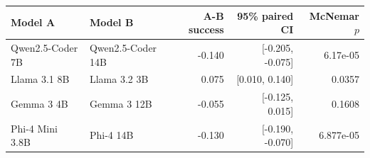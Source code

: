 \begin{tabular}{llrrr}
\toprule
Model A & Model B & A-B success & 95\% paired CI & McNemar $p$ \\
\midrule
Qwen2.5-Coder 7B & Qwen2.5-Coder 14B & -0.140 & [-0.205, -0.075] & 6.17e-05 \\
Llama 3.1 8B & Llama 3.2 3B & 0.075 & [0.010, 0.140] & 0.0357 \\
Gemma 3 4B & Gemma 3 12B & -0.055 & [-0.125, 0.015] & 0.1608 \\
Phi-4 Mini 3.8B & Phi-4 14B & -0.130 & [-0.190, -0.070] & 6.877e-05 \\
\bottomrule
\end{tabular}
